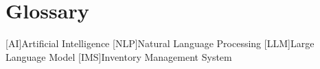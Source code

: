 \chapter{Glossary}

\footnotesize
\SingleSpacing

\begin{multicols}{2}
\begin{acronym}[AAAAAA]

	[AI]{Artificial Intelligence}
	[NLP]{Natural Language Processing}
	[LLM]{Large Language Model}
	[IMS]{Inventory Management System}

\end{acronym}
\end{multicols}

